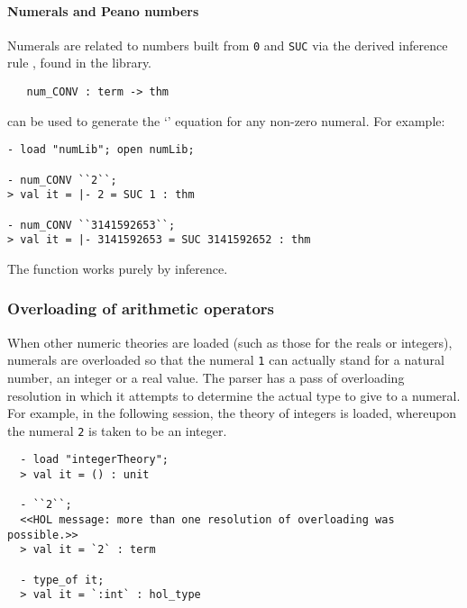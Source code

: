 \paragraph{Numerals and Peano numbers}

Numerals are related to numbers built from {\small\verb+0+} and
{\small\verb+SUC+} via the derived inference rule
, found in the  library.

\begin{boxed}
\begin{verbatim}
   num_CONV : term -> thm
\end{verbatim}
\end{boxed}

\noindent {} can be used to generate the `'
equation for any non-zero numeral.  For example:

\setcounter{sessioncount}{0}
\begin{session}
\begin{verbatim}
- load "numLib"; open numLib;

- num_CONV ``2``;
> val it = |- 2 = SUC 1 : thm

- num_CONV ``3141592653``;
> val it = |- 3141592653 = SUC 3141592652 : thm
\end{verbatim}
\end{session}

\noindent The  function works purely by inference.

\subsubsection{Overloading of arithmetic operators}
\label{arith-overloading}

When other numeric theories are loaded (such as those for the reals or
integers), numerals are overloaded so that the numeral {\small\verb+1+} can
actually stand for a natural number, an integer or a real value. The
parser has a pass of overloading resolution in which it attempts to
determine the actual type to give to a numeral. For example, in the
following session, the theory of integers is loaded, whereupon the
numeral \verb+2+ is taken to be an integer.
%
\begin{session}
{\small
\begin{verbatim}
  - load "integerTheory";
  > val it = () : unit

  - ``2``;
  <<HOL message: more than one resolution of overloading was possible.>>
  > val it = `2` : term

  - type_of it;
  > val it = `:int` : hol_type
\end{verbatim}}
\end{session}

